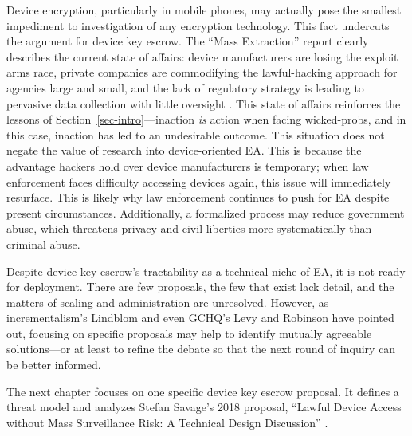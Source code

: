 \documentclass[conference]{IEEEtran}
\def\ii#1{\mbox{\textit{#1}}}
\newcommand{\mysec}[1]{Section~\ref{#1}}
\begin{document}
Device encryption, particularly in mobile phones, may actually pose the smallest impediment to investigation of any
encryption technology. This fact undercuts the argument for device key escrow. The ``Mass Extraction'' report clearly
describes the current state of affairs: device manufacturers are losing the exploit arms race, private companies are
commodifying the \ac{lawful-hacking} approach for agencies large and small, and the lack of regulatory strategy is
leading to pervasive data collection with little oversight \cite{koepke_2020}. This state of affairs reinforces the
lessons of \mysec{sec-intro}---inaction \ii{is} action when facing \acp{wicked-prob}, and in this case, inaction has led
to an undesirable outcome. This situation does not negate the value of research into device-oriented \ac{EA}. This is
because the advantage hackers hold over device manufacturers is temporary; when law enforcement faces difficulty
accessing devices again, this issue will immediately resurface. This is likely why law enforcement continues to push for
\ac{EA} despite present circumstances. Additionally, a formalized process may reduce government abuse, which threatens
privacy and civil liberties more systematically than criminal abuse.


Despite device key escrow's tractability as a technical niche of \ac{EA}, it is not ready for deployment. There are few
proposals, the few that exist lack detail, and the matters of scaling and administration are unresolved. However, as
\ac{incrementalism}'s Lindblom and even \ac{GCHQ}'s Levy and Robinson have pointed out, focusing on specific proposals
may help to identify mutually agreeable solutions---or at least to refine the debate so that the next round of inquiry
can be better informed.

The next chapter focuses on one specific device key escrow proposal. It defines a threat model and analyzes Stefan
Savage's 2018 proposal, ``Lawful Device Access without Mass Surveillance Risk: A Technical Design Discussion''
\cite{savage_lawful_2018}.




\end{document}
